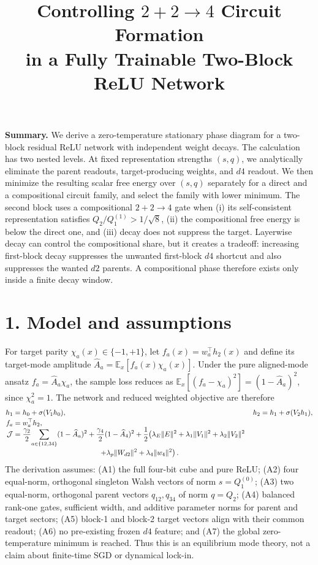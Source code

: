 \documentclass[10pt]{article}
\title{\vspace{-1.3cm}\textbf{Controlling $2+2\!\to\!4$ Circuit Formation\\
in a Fully Trainable Two-Block ReLU Network}}
\author{}
\date{\vspace{-1.15cm}}
\begin{document}
\maketitle
\vspace{-0.75cm}

\textbf{Summary.}
We derive a zero-temperature stationary phase diagram for a two-block residual ReLU network
with independent weight decays.  The calculation has two nested levels.  At fixed representation
strengths $(s,q)$, we analytically eliminate the parent readouts, target-producing weights, and
$d4$ readout.  We then minimize the resulting scalar free energy over $(s,q)$ separately for a
direct and a compositional circuit family, and select the family with lower minimum.  The second
block uses a compositional $2+2\to4$ gate when (i) its self-consistent representation satisfies
$Q_2/Q_1^{(1)}>1/\sqrt8$, (ii) the compositional free energy is below the direct one, and
(iii) decay does not suppress the target.  Layerwise decay can control the compositional share,
but it creates a tradeoff: increasing first-block decay suppresses the unwanted first-block
$d4$ shortcut and also suppresses the wanted $d2$ parents.  A compositional phase therefore
exists only inside a finite decay window.

\section*{1. Model and assumptions}
For target parity $\chi_a(x)\in\{-1,+1\}$, let $f_a(x)=w_a^\top h_2(x)$ and define its
target-mode amplitude $\widehat A_a=\mathbb E_x[f_a(x)\chi_a(x)]$.  Under the pure aligned-mode
ansatz $f_a=\widehat A_a\chi_a$, the sample loss reduces as
$\mathbb E_x[(f_a-\chi_a)^2]=(1-\widehat A_a)^2$, since $\chi_a^2=1$.  The network and
reduced weighted objective are therefore
\begin{align}
h_1&=h_0+\sigma(V_1h_0),& h_2&=h_1+\sigma(V_2h_1),\nonumber\\[-2pt]
f_a&=w_a^\top h_2,\nonumber\\[-5pt]
\mathcal J&=\frac{\gamma_2}{2}\!\sum_{a\in\{12,34\}}(1-\widehat A_a)^2
+\frac{\gamma_4}{2}(1-\widehat A_4)^2
+\frac12\!\left(\lambda_E\|E\|^2+\lambda_1\|V_1\|^2+\lambda_2\|V_2\|^2\right.\nonumber\\[-2pt]
&\hspace{4.2cm}\left.+\lambda_p\|W_{d2}\|^2+\lambda_4\|w_4\|^2\right).
\label{eq:objective}
\end{align}
The derivation assumes: (A1) the full four-bit cube and pure ReLU; (A2) four equal-norm,
orthogonal singleton Walsh vectors of norm $s=Q_1^{(0)}$; (A3) two equal-norm, orthogonal
parent vectors $q_{12},q_{34}$ of norm $q=Q_2$; (A4) balanced rank-one gates, sufficient
width, and additive parameter norms for parent and target sectors; (A5) block-1 and block-2
target vectors align with their common readout; (A6) no pre-existing frozen $d4$ feature;
and (A7) the global zero-temperature minimum is reached.  Thus this is an equilibrium
mode theory, not a claim about finite-time SGD or dynamical lock-in.
\end{document}
